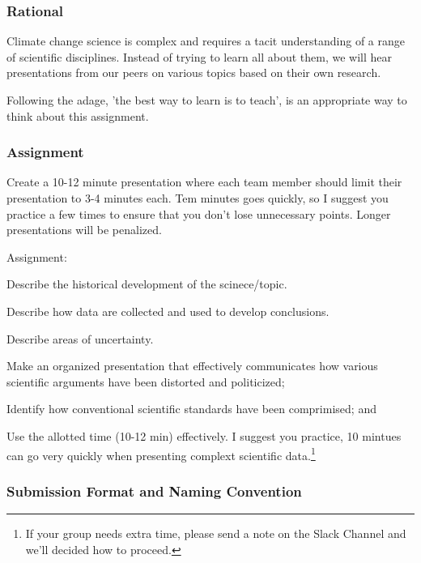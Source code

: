 
\subsubsection{Rational}

Climate change science is complex and requires a tacit understanding of a range of scientific disciplines. Instead of trying to learn all about them, we will hear presentations from our peers on various topics based on their own research. 

Following the adage, 'the best way to learn is to teach', is an appropriate way to think about this assignment. 

\subsubsection{Assignment}

Create a 10-12 minute presentation where each team member should limit their presentation to 3-4 minutes each. Tem minutes goes quickly, so I suggest you practice a few times to ensure that you don't lose unnecessary points. Longer presentations will be penalized.  

\noindent Assignment: 
\begin{itemize*}
  \item Describe the historical development of the scinece/topic.
  \item Describe how data are collected and used to develop conclusions.
  \item Describe areas of uncertainty.
  \item Make an organized presentation that effectively communicates how various scientific arguments have been distorted and politicized;
  \item Identify how conventional scientific standards have been comprimised; and
  \item Use the allotted time (10-12 min) effectively. I suggest you practice, 10 mintues can go very quickly when presenting complext scientific data.\footnote{If your group needs extra time, please send a note on the Slack Channel and we'll decided how to proceed.}
\end{itemize*}

\subsubsection{Submission Format and Naming Convention}

